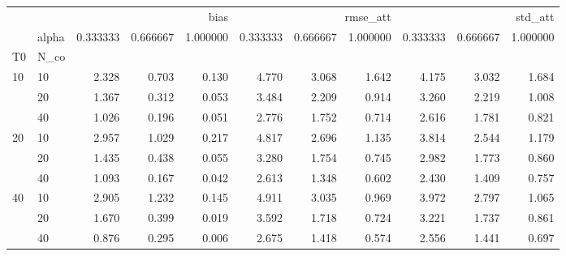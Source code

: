 \begin{tabular}{llrrrrrrrrr}
\toprule
 &  & \multicolumn{3}{r}{bias} & \multicolumn{3}{r}{rmse_att} & \multicolumn{3}{r}{std_att} \\
 & alpha & 0.333333 & 0.666667 & 1.000000 & 0.333333 & 0.666667 & 1.000000 & 0.333333 & 0.666667 & 1.000000 \\
T0 & N_co &  &  &  &  &  &  &  &  &  \\
\midrule
\multirow[t]{3}{*}{10} & 10 & 2.328 & 0.703 & 0.130 & 4.770 & 3.068 & 1.642 & 4.175 & 3.032 & 1.684 \\
 & 20 & 1.367 & 0.312 & 0.053 & 3.484 & 2.209 & 0.914 & 3.260 & 2.219 & 1.008 \\
 & 40 & 1.026 & 0.196 & 0.051 & 2.776 & 1.752 & 0.714 & 2.616 & 1.781 & 0.821 \\
\cline{1-11}
\multirow[t]{3}{*}{20} & 10 & 2.957 & 1.029 & 0.217 & 4.817 & 2.696 & 1.135 & 3.814 & 2.544 & 1.179 \\
 & 20 & 1.435 & 0.438 & 0.055 & 3.280 & 1.754 & 0.745 & 2.982 & 1.773 & 0.860 \\
 & 40 & 1.093 & 0.167 & 0.042 & 2.613 & 1.348 & 0.602 & 2.430 & 1.409 & 0.757 \\
\cline{1-11}
\multirow[t]{3}{*}{40} & 10 & 2.905 & 1.232 & 0.145 & 4.911 & 3.035 & 0.969 & 3.972 & 2.797 & 1.065 \\
 & 20 & 1.670 & 0.399 & 0.019 & 3.592 & 1.718 & 0.724 & 3.221 & 1.737 & 0.861 \\
 & 40 & 0.876 & 0.295 & 0.006 & 2.675 & 1.418 & 0.574 & 2.556 & 1.441 & 0.697 \\
\cline{1-11}
\bottomrule
\end{tabular}

